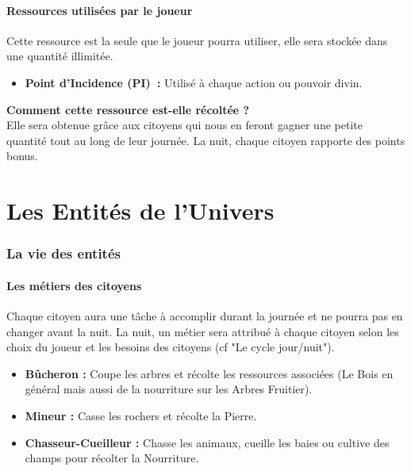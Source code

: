 \documentclass[a4paper]{article}
\begin{document}
      \subsection{Ressources utilisées par le joueur}
        Cette ressource est la seule que le joueur pourra utiliser, elle sera stockée dans une quantité illimitée.
        \begin{itemize}
          \item \textbf{Point d'Incidence (PI) :} \small{ Utilisé à chaque action ou pouvoir divin.}
        \end{itemize}
        \textbf{Comment cette ressource est-elle récoltée ? }\\Elle sera obtenue grâce aux citoyens qui nous en feront gagner une petite quantité tout au long de leur journée. La nuit, chaque citoyen rapporte des points bonus.


  \newpage
  \part{Les Entités de l'Univers}
    \section{La vie des entités}

      \subsection{Les métiers des citoyens}
        Chaque citoyen aura une tâche à accomplir durant la journée et ne pourra pas en changer avant la nuit. La nuit, un métier sera attribué à chaque citoyen selon les choix du joueur et les besoins des citoyens (cf "Le cycle jour/nuit").
        \begin{itemize}
          \item \textbf{Bûcheron :} \small{ Coupe les arbres et récolte les ressources associées (Le Bois en général mais aussi de la nourriture sur les Arbres Fruitier).}
          \item \textbf{Mineur :} \small{ Casse les rochers et récolte la Pierre.}
          \item \textbf{Chasseur-Cueilleur :} \small{ Chasse les animaux, cueille les baies ou cultive des champs pour récolter la Nourriture.}
        \end{itemize}
\end{document}
